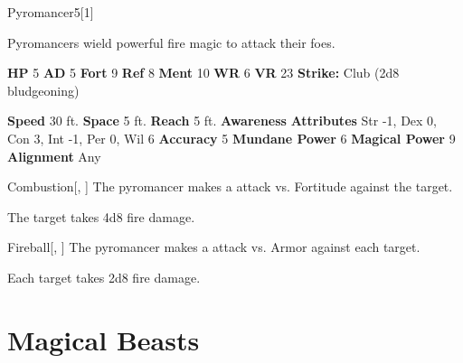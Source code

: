  
  \begin{monsection}{Pyromancer}{5}[1]
    \vspace{-1em}\vspace{-1em}
    \vspace{0em}

    
        Pyromancers wield powerful fire magic to attack their foes.
      

    \begin{spellcontent}
      \begin{spelltargetinginfo}
        \pari \textbf{HP} 5 \monsep
          \textbf{AD} 5 \monsep
          \textbf{Fort} 9 \monsep
          \textbf{Ref} 8 \monsep
          \textbf{Ment} 10
        \pari \textbf{WR} 6 \monsep
        \textbf{VR} 23
        \pari \textbf{Strike:}
            Club  (2d8 bludgeoning)
      \end{spelltargetinginfo}
    \end{spellcontent}
    \begin{monsterfooter}
      \pari \textbf{Speed} 30 ft. \monsep
        \textbf{Space} 5 ft. \monsep
        \textbf{Reach} 5 ft.
      \pari \textbf{Awareness} 
      \pari \textbf{Attributes}
        Str -1, Dex 0,
        Con 3, Int -1,
        Per 0, Wil 6
      \pari \textbf{Accuracy} 5 \monsep
        \textbf{Mundane Power} 6 \monsep
      \textbf{Magical Power} 9
      \pari \textbf{Alignment} Any
    \end{monsterfooter}
  \end{monsection}
  \begin{freeability}{Combustion}[, ]
       The pyromancer makes a  attack
        vs. Fortitude against the target.
    
    \hit The target takes 4d8 fire damage.
    \end{freeability}
  

    \begin{freeability}{Fireball}[, ]
       The pyromancer makes a  attack
        vs. Armor against each target.
    
    \hit Each target takes 2d8 fire damage.
    \end{freeability}
  
        \newpage
        \section{Magical Beasts}

